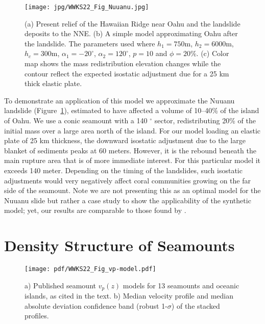 \begin{figure}
\centering
\texttt{[image: jpg/WWKS22\_Fig\_Nuuanu.jpg]}
\caption{(a) Present relief of the Hawaiian Ridge near Oahu and the landslide deposits to the NNE.
(b) A simple model approximating Oahu after the landslide.  The parameters used where $h_1 = 750$m, $h_2 = 6000$m,
$h_c = 300$m, $\alpha_1 = -20^{\circ}$, $\alpha_2 = 120^{\circ}$, $p = 10$ and $\phi = 20$\%.
(c) Color map shows the mass redistribution elevation changes while the contour reflect the expected isostatic adjustment due for a 25 km
thick elastic plate.}
\label{WWKS22_Fig_Nuuanu}
\end{figure}
To demonstrate an application of this model we approximate the Nuuanu landslide (Figure~\ref{WWKS22_Fig_Nuuanu}),
estimated to have affected a volume of 10--40\% of the island of Oahu. We use a conic seamount with a 140 $^{\circ}$ sector,
redistributing 20\% of the initial mass over a large area north of the island.  For our model loading an elastic plate
of 25 km thickness, the downward isostatic adjustment due to the large blanket of sediments peaks at 60 meters.  However, it is
the rebound beneath the main rupture area that is of more immediate interest.  For this particular model it exceeds
140 meter.  Depending on the timing of the landslides, such isostatic adjustments would very negatively affect coral
communities growing on the far side of the seamount. Note we are not presenting this as an optimal model for the Nuuanu
slide but rather a case study to show the applicability of the synthetic model; yet, our results are comparable to those found
by \citet{SW2000}.

\section{Density Structure of Seamounts}

\begin{figure}
\centering
\texttt{[image: pdf/WWKS22\_Fig\_vp-model.pdf]}
\caption{a) Published seamount $v_p(z)$ models for 13 seamounts and oceanic islands, as cited in the text.
b) Median velocity profile and median absolute deviation confidence band (robust 1-$\sigma$) of the stacked profiles.}
\label{WWKS22_Fig_vp-model}
\end{figure}

